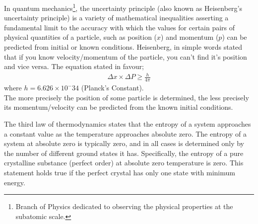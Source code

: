 \begin{phybox}{}
{In quantum mechanics\footnote{Branch of Physics dedicated to observing the physical properties at the subatomic scale.}, the uncertainty principle (also known as Heisenberg's uncertainty principle) is a variety of mathematical inequalities asserting a fundamental limit to the accuracy with which the values for certain pairs of physical quantities of a particle, such as position ($x$) and momentum ($p$) can be predicted from initial or known conditions. Heisenberg, in simple words stated that if you know velocity/momentum of the particle, you can't find it's position and vice versa. The equation stated in favour;
\begin{align*}
    \Delta x \times \Delta P \geq \frac{h}{4\pi}
\end{align*}
where  $h = 6.626 \times 10^-34$ (Planck's Constant).\\
The more precisely the position of some particle is determined, the less precisely its momentum/velocity can be predicted from the known initial conditions.}
\end{phybox}
\begin{chembox}{}
    {The third law of thermodynamics states that the entropy of a system approaches a constant value as the temperature approaches absolute zero. The entropy of a system at absolute zero is typically zero, and in all cases is determined only by the number of different ground states it has. Specifically, the entropy of a pure crystalline substance (perfect order) at absolute zero temperature is zero. This statement holds true if the perfect crystal has only one state with minimum energy.}
\end{chembox}
\begin{mathbox}{\text{\subsection{}}}
    
\end{mathbox}
